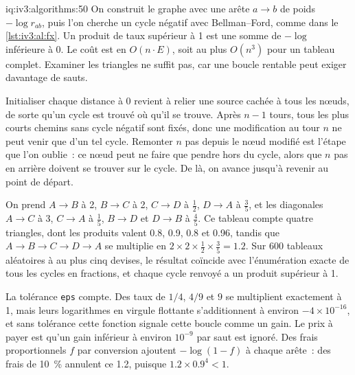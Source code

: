 \begin{solution}{iq:iv3:algorithms:50}
On construit le graphe avec une arête $a \to b$ de poids $-\log r_{ab}$, puis l'on cherche un cycle négatif avec Bellman--Ford, comme dans le \cref{lst:iv3:al:fx}. Un produit de taux supérieur à 1 est une somme de $-\log$ inférieure à 0. Le coût est en $O(n \cdot E)$, soit au plus $O(n^3)$ pour un tableau complet. Examiner les triangles ne suffit pas, car une boucle rentable peut exiger davantage de sauts.
\label{lst:iv3:al:fx}

Initialiser chaque distance à 0 revient à relier une source cachée à tous les nœuds, de sorte qu'un cycle est trouvé où qu'il se trouve. Après $n - 1$ tours, tous les plus courts chemins sans cycle négatif sont fixés, donc une modification au tour $n$ ne peut venir que d'un tel cycle. Remonter $n$ pas depuis le nœud modifié est l'étape que l'on oublie~: ce nœud peut ne faire que pendre hors du cycle, alors que $n$ pas en arrière doivent se trouver sur le cycle. De là, on avance jusqu'à revenir au point de départ.

On prend $A \to B$ à 2, $B \to C$ à 2, $C \to D$ à $\tfrac{1}{2}$, $D \to A$ à $\tfrac{3}{5}$, et les diagonales $A \to C$ à 3, $C \to A$ à $\tfrac{1}{5}$, $B \to D$ et $D \to B$ à $\tfrac{4}{5}$. Ce tableau compte quatre triangles, dont les produits valent 0.8, 0.9, 0.8 et 0.96, tandis que $A \to B \to C \to D \to A$ se multiplie en $2 \times 2 \times \tfrac{1}{2} \times \tfrac{3}{5} = 1.2$. Sur 600 tableaux aléatoires à au plus cinq devises, le résultat coïncide avec l'énumération exacte de tous les cycles en fractions, et chaque cycle renvoyé a un produit supérieur à 1.

La tolérance \texttt{eps} compte. Des taux de $1/4$, $4/9$ et $9$ se multiplient exactement à 1, mais leurs logarithmes en virgule flottante s'additionnent à environ $-4 \times 10^{-16}$, et sans tolérance cette fonction signale cette boucle comme un gain. Le prix à payer est qu'un gain inférieur à environ $10^{-9}$ par saut est ignoré. Des frais proportionnels $f$ par conversion ajoutent $-\log(1 - f)$ à chaque arête~: des frais de 10~\% annulent ce 1.2, puisque $1.2 \times 0.9^4 < 1$.

\end{solution}

